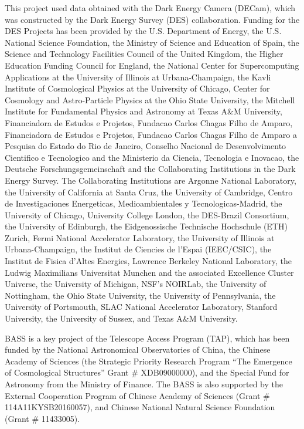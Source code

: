 \documentclass{aastex631}
\begin{document}
This project used data obtained with the Dark Energy Camera (DECam), which was constructed by the Dark Energy Survey (DES) collaboration. Funding for the DES Projects has been provided by the U.S. Department of Energy, the U.S. National Science Foundation, the Ministry of Science and Education of Spain, the Science and Technology Facilities Council of the United Kingdom, the Higher Education Funding Council for England, the National Center for Supercomputing Applications at the University of Illinois at Urbana-Champaign, the Kavli Institute of Cosmological Physics at the University of Chicago, Center for Cosmology and Astro-Particle Physics at the Ohio State University, the Mitchell Institute for Fundamental Physics and Astronomy at Texas A\&M University, Financiadora de Estudos e Projetos, Fundacao Carlos Chagas Filho de Amparo, Financiadora de Estudos e Projetos, Fundacao Carlos Chagas Filho de Amparo a Pesquisa do Estado do Rio de Janeiro, Conselho Nacional de Desenvolvimento Cientifico e Tecnologico and the Ministerio da Ciencia, Tecnologia e Inovacao, the Deutsche Forschungsgemeinschaft and the Collaborating Institutions in the Dark Energy Survey. The Collaborating Institutions are Argonne National Laboratory, the University of California at Santa Cruz, the University of Cambridge, Centro de Investigaciones Energeticas, Medioambientales y Tecnologicas-Madrid, the University of Chicago, University College London, the DES-Brazil Consortium, the University of Edinburgh, the Eidgenossische Technische Hochschule (ETH) Zurich, Fermi National Accelerator Laboratory, the University of Illinois at Urbana-Champaign, the Institut de Ciencies de l’Espai (IEEC/CSIC), the Institut de Fisica d’Altes Energies, Lawrence Berkeley National Laboratory, the Ludwig Maximilians Universitat Munchen and the associated Excellence Cluster Universe, the University of Michigan, NSF’s NOIRLab, the University of Nottingham, the Ohio State University, the University of Pennsylvania, the University of Portsmouth, SLAC National Accelerator Laboratory, Stanford University, the University of Sussex, and Texas A\&M University.

BASS is a key project of the Telescope Access Program (TAP), which has been funded by the National Astronomical Observatories of China, the Chinese Academy of Sciences (the Strategic Priority Research Program “The Emergence of Cosmological Structures” Grant \# XDB09000000), and the Special Fund for Astronomy from the Ministry of Finance. The BASS is also supported by the External Cooperation Program of Chinese Academy of Sciences (Grant \# 114A11KYSB20160057), and Chinese National Natural Science Foundation (Grant \# 11433005).
\end{document}
